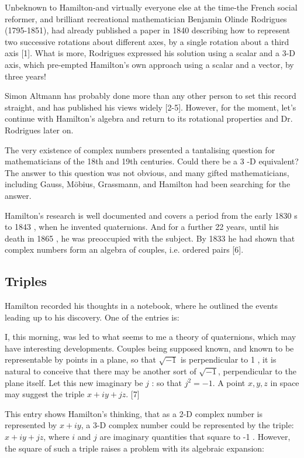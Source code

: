 \documentclass[10pt]{article}
\begin{document}
Unbeknown to Hamilton-and virtually everyone else at the time-the French social reformer, and brilliant recreational mathematician Benjamin Olinde Rodrigues (1795-1851), had already published a paper in 1840 describing how to represent two successive rotations about different axes, by a single rotation about a third axis [1]. What is more, Rodrigues expressed his solution using a scalar and a 3-D axis, which pre-empted Hamilton's own approach using a scalar and a vector, by three years!

Simon Altmann has probably done more than any other person to set this record straight, and has published his views widely [2-5]. However, for the moment, let's continue with Hamilton's algebra and return to its rotational properties and Dr. Rodrigues later on.

The very existence of complex numbers presented a tantalising question for mathematicians of the 18th and 19th centuries. Could there be a 3 -D equivalent? The answer to this question was not obvious, and many gifted mathematicians, including Gauss, Möbius, Grassmann, and Hamilton had been searching for the answer.

Hamilton's research is well documented and covers a period from the early 1830 s to 1843 , when he invented quaternions. And for a further 22 years, until his death in 1865 , he was preoccupied with the subject. By 1833 he had shown that complex numbers form an algebra of couples, i.e. ordered pairs [6].

\subsection{Triples}
Hamilton recorded his thoughts in a notebook, where he outlined the events leading up to his discovery. One of the entries is:

I, this morning, was led to what seems to me a theory of quaternions, which may have interesting developments. Couples being supposed known, and known to be representable by points in a plane, so that $\sqrt{-1}$ is perpendicular to 1 , it is natural to conceive that there may be another sort of $\sqrt{-1}$, perpendicular to the plane itself. Let this new imaginary be $j$ : so that $j^{2}=-1$. A point $x, y, z$ in space may suggest the triple $x+i y+j z$. [7]

This entry shows Hamilton's thinking, that as a 2-D complex number is represented by $x+i y$, a 3-D complex number could be represented by the triple: $x+i y+j z$, where $i$ and $j$ are imaginary quantities that square to -1 . However, the square of such a triple raises a problem with its algebraic expansion:
\end{document}
